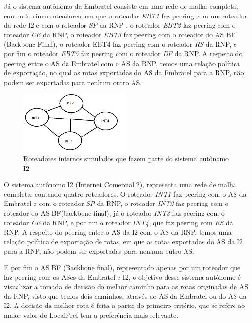 \documentclass[12pt,a4paper]{report}
\begin{document}
J\'a o sistema aut\^onomo da Embratel consiste em uma rede de malha completa, contendo cinco roteadores, em que o roteador \textit{EBT1} faz peering com um roteador da rede I2 e com o roteador \textit{SP} da RNP , o roteador \textit{EBT2} faz peering com o roteador \textit{CE} da RNP, o roteador \textit{EBT3} faz peering com o roteador do AS BF (Backbone Final), o roteador EBT4 faz peering com o roteador \textit{RS} da RNP, e por fim o roteador \textit{EBT5} faz peering com o roteador \textit{DF} da RNP. A respeito do peering entre o AS da Embratel com o AS da RNP, temos uma rela\c{c}\~ao pol\'itica de exporta\c{c}\~ao, no qual as rotas exportadas do AS da Embratel para a RNP, n\~ao podem ser exportadas para nenhum outro AS.

\begin{figure}[!htb]
 \centering
 \includegraphics[width=0.5\textwidth]{Imagens/I2_1_}
  \caption{\label{fig:Internet Comercial 2} Roteadores internos simulados que fazem parte do sistema aut\^onomo I2}
\end{figure}

O sistema aut\^onomo I2 (Internet Comercial 2), representa uma rede de malha completa, contendo quatro roteadores. O roteador \textit{INT1} faz peering com o AS da Embratel e com o roteador \textit{SP} da RNP, o roteador \textit{INT2} faz peering com o roteador do AS BF(backbone final), j\'a o roteador \textit{INT3} faz peering com o roteador \textit{CE} da RNP, e por fim o roteador \textit{INT4}, que faz peering com \textit{RS} da RNP. A respeito do peering entre o AS da I2 com o AS da RNP, temos uma rela\c{c}\~ao pol\'itica de exporta\c{c}\~ao de rotas, em que as rotas exportadas do AS da I2 para a RNP, n\~ao podem ser exportadas para nenhum outro AS.

E por fim o AS BF (Backbone final), representado apenas por um roteador que faz peering com os ASes da Embratel e I2, o objetivo desse sistema aut\^onomo \'e visualizar a tomada de decis\~ao do melhor caminho para as rotas originadas do AS da RNP, visto que temos dois caminhos, atrav\'es do AS da Embratel ou do AS da I2. A decis\~ao da melhor rota \'e feita a partir do primeiro crit\'erio, que se refere ao maior valor do LocalPref tem a prefer\^encia mais relevante.
\end{document}
